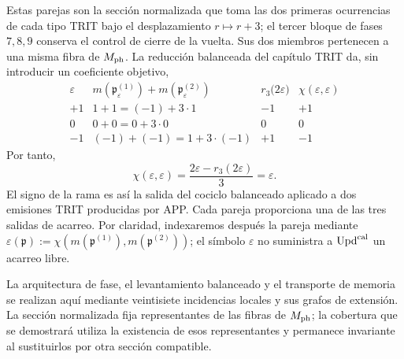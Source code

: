 Estas parejas son la sección normalizada que toma las dos primeras
ocurrencias de cada tipo TRIT bajo el desplazamiento \(r\mapsto r+3\); el
tercer bloque de fases \(7,8,9\) conserva el control de cierre de la vuelta.
Sus dos miembros pertenecen a una misma fibra de \(M_{\rm ph}\). La
reducción balanceada del capítulo TRIT da, sin introducir un coeficiente
objetivo,
\begin{equation}
 \begin{array}{c|c|c|c}
 \varepsilon&m(\mathfrak p_\varepsilon^{(1)})
                  +m(\mathfrak p_\varepsilon^{(2)})
   &r_3\bigl(2\varepsilon\bigr)&
   \chi(\varepsilon,\varepsilon)\\ \hline
 +1&1+1=(-1)+3\cdot1&-1&+1\\
 0&0+0=0+3\cdot0&0&0\\
 -1&(-1)+(-1)=1+3\cdot(-1)&+1&-1
 \end{array}
 \label{eq:tres-carry-derivados-ch}
\end{equation}
Por tanto,
\begin{equation}
 \chi(\varepsilon,\varepsilon)
 =\frac{2\varepsilon-r_3(2\varepsilon)}3=\varepsilon.
 \label{eq:carry-no-parametrico-ch}
\end{equation}
El signo de la rama es así la salida del cociclo balanceado aplicado a dos
emisiones TRIT producidas por APP. Cada pareja proporciona una de las tres
salidas de acarreo. Por claridad, indexaremos después la pareja mediante
\(\varepsilon(\mathfrak p):=
\chi(m(\mathfrak p^{(1)}),m(\mathfrak p^{(2)}))\); el símbolo
\(\varepsilon\) no suministra a \(\operatorname{Upd}^{\rm cal}\) un acarreo libre.

La arquitectura de fase, el levantamiento balanceado y el transporte de
memoria se realizan aquí mediante veintisiete incidencias locales y sus
grafos de extensión. La sección normalizada fija representantes de las
fibras de \(M_{\rm ph}\); la cobertura que se demostrará utiliza la existencia
de esos representantes y permanece invariante al sustituirlos por otra
sección compatible.

